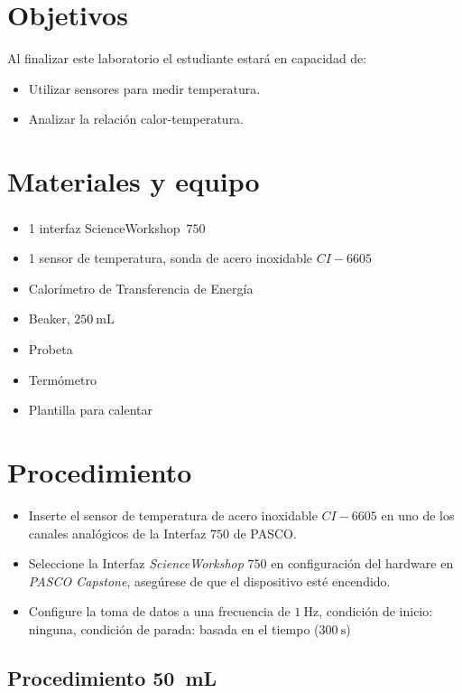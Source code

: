 \documentclass[12pt,letterpaper]{report}
\newcommand{\obj}{Objetivos}
\newcommand{\mat}{Materiales y equipo}
\newcommand{\pro}{Procedimiento}
\newcommand{\capacidad}{Al finalizar este laboratorio el estudiante estará en capacidad de:}
\begin{document}
\section{\obj}
\capacidad
\begin{itemize}
\item Utilizar sensores para medir temperatura.
\item Analizar la relación calor-temperatura.
\end{itemize}
\section{\mat}
\begin{itemize}
\item 1 interfaz ScienceWorkshop\,\textsuperscript{\textregistered} $750$
\item 1 sensor de temperatura, sonda de acero inoxidable $CI-6605$
\item Calorímetro de Transferencia de Energía
\item Beaker, $\SI{250}{\milli\liter}$
\item Probeta
\item Termómetro
\item Plantilla para calentar
\end{itemize}
\section{\pro}
\begin{itemize}
    \item Inserte el sensor de temperatura de acero inoxidable $CI-6605$ en uno de los canales analógicos de la Interfaz $750$ de PASCO.
    \item Seleccione la Interfaz \textit{ScienceWorkshop} $750$ en configuración del hardware en \textit{PASCO Capstone}, asegúrese de que el dispositivo esté encendido.
    \item Configure la toma de datos a una frecuencia de $\SI{1}{\hertz}$, condición de inicio: ninguna, condición de parada: basada en el tiempo ($\SI{300}{\second}$) 
\end{itemize}
\subsection{Procedimiento \SI{50}{\milli\liter}}
\end{document}
